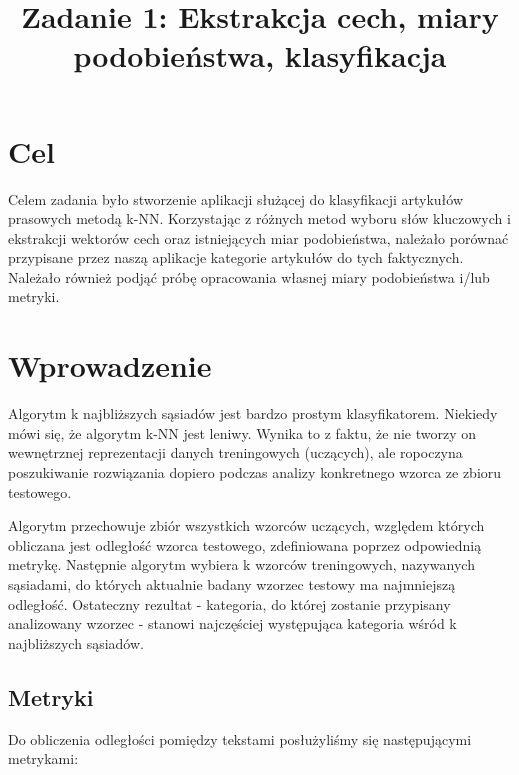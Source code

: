 \documentclass{classrep}
\author{
\studentinfo{Mateusz Walczak}{216911} \and
\studentinfo{Konrad Kajszczak}{216790}
}
\title{Zadanie 1: Ekstrakcja cech, miary podobieństwa, klasyfikacja}
\begin{document}
\maketitle

\section{Cel}
{Celem zadania było stworzenie aplikacji służącej do klasyfikacji artykułów prasowych metodą k-NN. Korzystając z różnych metod
wyboru słów kluczowych i ekstrakcji wektorów cech oraz istniejących miar podobieństwa, należało porównać przypisane przez naszą aplikacje kategorie artykułów do tych faktycznych. Należało również podjąć próbę opracowania własnej miary podobieństwa i/lub metryki.}

\section{Wprowadzenie}
 Algorytm k najbliższych sąsiadów jest bardzo prostym klasyfikatorem. Niekiedy mówi się, że algorytm k-NN jest leniwy. Wynika to z faktu, że nie tworzy on wewnętrznej reprezentacji danych treningowych (uczących), ale ropoczyna poszukiwanie rozwiązania dopiero podczas analizy konkretnego wzorca ze zbioru testowego. \newline

Algorytm przechowuje zbiór wszystkich wzorców uczących, względem których obliczana jest odległość wzorca testowego, zdefiniowana poprzez odpowiednią metrykę. Następnie algorytm wybiera k wzorców treningowych, nazywanych sąsiadami, do których aktualnie badany wzorzec testowy ma najmniejszą odległość. Ostateczny rezultat - kategoria, do której zostanie przypisany analizowany wzorzec - stanowi najczęściej występująca kategoria wśród k najbliższych sąsiadów.

\subsection{Metryki}

Do obliczenia odległości pomiędzy tekstami posłużyliśmy się następującymi metrykami:
\end{document}
